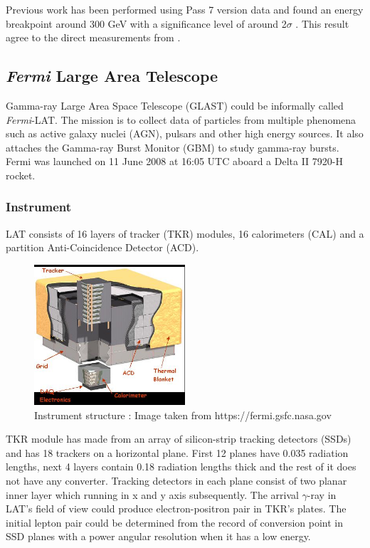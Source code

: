 \par Previous work has been performed using Pass 7 version data \cite{FermiPass7} and found an energy breakpoint around 300 GeV with a significance level of around 2$\sigma$ \cite{previouswork}. This result agree to the direct measurements from \cite{AMS-02,PAMELA}.


\subsection{\textit{Fermi} Large Area Telescope}

Gamma-ray Large Area Space Telescope (GLAST) could be informally called \textit{Fermi}-LAT. The mission is to collect data of particles from multiple phenomena such as active galaxy nuclei (AGN), pulsars and other high energy sources.
It also attaches the Gamma-ray Burst Monitor (GBM) to study gamma-ray bursts. Fermi was launched on 11 June 2008 at 16:05 UTC aboard a Delta II 7920-H rocket.


\subsubsection*{Instrument}
LAT consists of 16 layers of tracker (TKR) modules, 16 calorimeters (CAL) and a partition Anti-Coincidence Detector (ACD). 

\begin{figure}[h!]
  \centering
    \includegraphics[width=0.5\textwidth]{img/LATStructure}
    \caption{Instrument structure : Image taken from https://fermi.gsfc.nasa.gov}
\end{figure}

\par TKR module has made from an array of silicon-strip tracking detectors (SSDs) and has 18 trackers on a horizontal plane. First 12 planes have 0.035 radiation lengths, next 4 layers contain 0.18 radiation lengths thick and the rest of it does not have any converter.
Tracking detectors in each plane consist of two planar inner layer which running in x and y axis subsequently. The arrival $\gamma$-ray in LAT's field of view could produce electron-positron pair in TKR's plates.
The initial lepton pair could be determined from the record of conversion point in SSD planes with a power angular resolution when it has a low energy.

